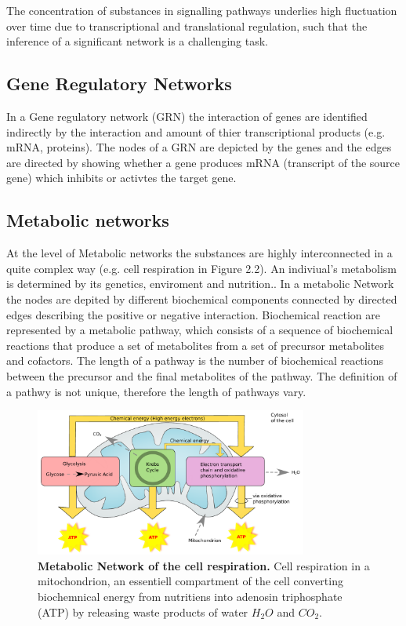 The concentration of substances in signalling pathways underlies high fluctuation over time due to transcriptional and translational regulation, such that the inference of a significant network is a challenging task.\citep{BIES:BIES20834} 

\subsection*{Gene Regulatory Networks}

In a Gene regulatory network (\gls{GRN}) the interaction of genes are identified indirectly by the interaction and amount of thier transcriptional products (e.g. mRNA, proteins). %
The nodes of a GRN are depicted by the genes and the edges are directed by showing whether a gene produces mRNA (transcript of the source gene) which inhibits or activtes the target gene. %


\subsection*{Metabolic networks}

At the level of Metabolic networks the substances are highly interconnected in a quite complex way (e.g. cell respiration in Figure 2.2). An indiviual's metabolism is determined by its genetics, enviroment and nutrition.\citep{8}. In a metabolic Network the nodes are depited by different biochemical components connected by directed edges describing the positive or negative interaction. Biochemical reaction are represented by a metabolic pathway, which consists of a sequence of biochemical reactions that produce a set of metabolites from a set of precursor metabolites and cofactors. The length of a pathway is the number of biochemical reactions between the precursor and the final metabolites of the pathway. The definition of a pathwy is not unique, therefore the length of pathways vary. \citep{9}

\begin{figure}[H]
\centering
\captionsetup{width=.8\linewidth}
\includegraphics[width=0.8\textwidth]{./Bilder/metabolic.pdf}
\caption[Metabolic Network]{\textbf{Metabolic Network of the cell respiration. } Cell respiration in a mitochondrion, an essentiell compartment of the cell converting biochemnical energy from nutritiens into adenosin triphosphate (\gls{ATP}) by releasing waste products of water $H_{2}O$ and $CO_{2}$.}
\label{fig:Fig.3.}
\end{figure} 

